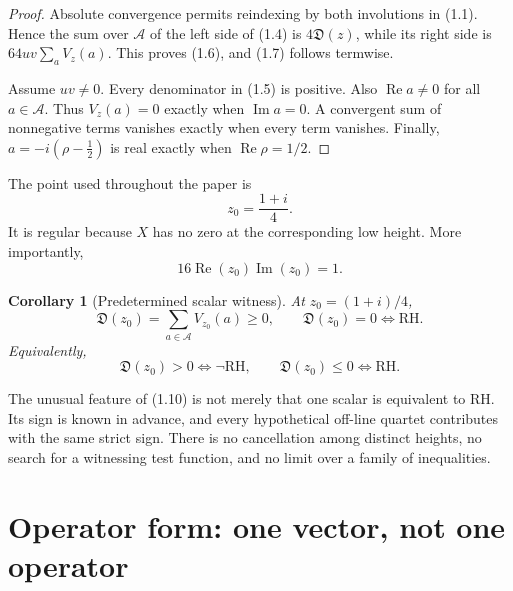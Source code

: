 \documentclass[11pt]{article}
\newtheorem{corollary}[theorem]{Corollary}
\theoremstyle{definition}
\theoremstyle{remark}
\newcommand{\cA}{\mathcal A}
\newcommand{\Rea}{\operatorname{Re}}
\newcommand{\Ima}{\operatorname{Im}}
\begin{document}
\begin{proof}
Absolute convergence permits reindexing by both involutions in (1.1).  Hence the sum over
$\cA$ of the left side of (1.4) is $4\mathfrak D(z)$, while its right side is
$64uv\sum_aV_z(a)$.  This proves (1.6), and (1.7) follows termwise.

Assume $uv\ne0$.  Every denominator in (1.5) is positive.  Also $\Rea a\ne0$ for all
$a\in\cA$.  Thus $V_z(a)=0$ exactly when $\Ima a=0$.  A convergent sum of nonnegative terms
vanishes exactly when every term vanishes.  Finally,
$a=-i(\rho-\tfrac12)$ is real exactly when $\Rea\rho=1/2$.
\end{proof}

The point used throughout the paper is
\begin{equation}
 z_0=\frac{1+i}{4}.                                      \tag{1.9}
\end{equation}
It is regular because $X$ has no zero at the corresponding low height.  More importantly,
\[
 16\Rea(z_0)\Ima(z_0)=1.
\]

\begin{corollary}[Predetermined scalar witness]
\label{cor:fixed}
At $z_0=(1+i)/4$,
\begin{equation}
 \boxed{
 \mathfrak D(z_0)=\sum_{a\in\cA}V_{z_0}(a)\geq0,
 \qquad
 \mathfrak D(z_0)=0\Longleftrightarrow\mathrm{RH}.}       \tag{1.10}
\end{equation}
Equivalently,
\begin{equation}
 \mathfrak D(z_0)>0\Longleftrightarrow\neg\mathrm{RH},
 \qquad
 \mathfrak D(z_0)\leq0\Longleftrightarrow\mathrm{RH}.    \tag{1.11}
\end{equation}
\end{corollary}

The unusual feature of (1.10) is not merely that one scalar is equivalent to RH.  Its sign is
known in advance, and every hypothetical off-line quartet contributes with the same strict sign.
There is no cancellation among distinct heights, no search for a witnessing test function, and
no limit over a family of inequalities.

\section{Operator form: one vector, not one operator}
\end{document}
